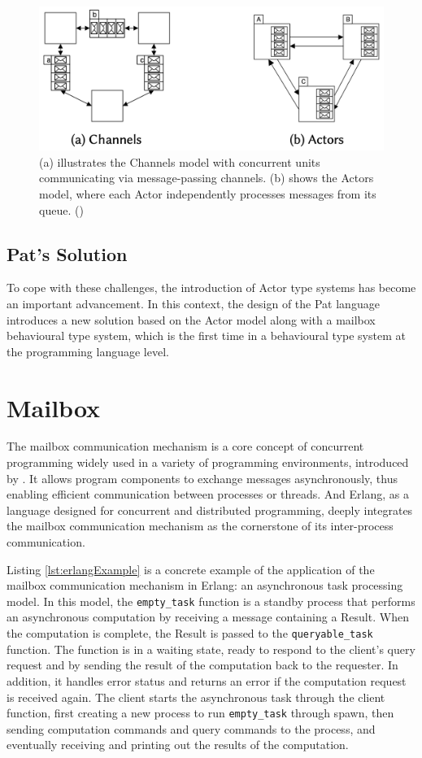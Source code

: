 \documentclass{l4proj}
\begin{document}
\begin{figure}
    \centering
    \includegraphics[width=0.7\linewidth]{images/channel_actor.png}    
    \caption{ (a) illustrates the Channels model with concurrent units communicating via message-passing channels. (b) shows the Actors model, where each Actor independently processes messages from its queue. (\cite{fowler_mixing})
    }
    \label{fig:channel_actor} 
\end{figure}

\subsection{Pat's Solution}
To cope with these challenges, the introduction of Actor type systems has become an important advancement. In this context, the design of the Pat language introduces a new solution based on the Actor model along with a mailbox behavioural type system, which is the first time in a behavioural type system at the programming language level.


\section{Mailbox}
The mailbox communication mechanism is a core concept of concurrent programming widely used in a variety of programming environments, introduced by 
\cite{ford_1976_hardware}. It allows program components to exchange messages asynchronously, thus enabling efficient communication between processes or threads. And Erlang, as a language designed for concurrent and distributed programming, deeply integrates the mailbox communication mechanism as the cornerstone of its inter-process communication.

Listing \ref{lst:erlangExample} is a concrete example of the application of the mailbox communication mechanism in Erlang: an asynchronous task processing model. In this model, the \texttt{empty\_task} function is a standby process that performs an asynchronous computation by receiving a message containing a Result. When the computation is complete, the Result is passed to the \texttt{queryable\_task} function. The function is in a waiting state, ready to respond to the client's query request and by sending the result of the computation back to the requester. In addition, it handles error status and returns an error if the computation request is received again. The client starts the asynchronous task through the client function, first creating a new process to run \texttt{empty\_task} through spawn, then sending computation commands and query commands to the process, and eventually receiving and printing out the results of the computation.
\end{document}
